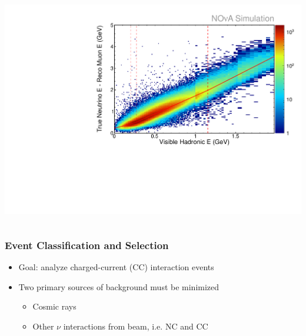 \documentclass[10pt,professionalfonts,xcolor=table]{beamer}
\begin{document}
\begin{frame}
\begin{columns}[c]
\includegraphics[height=\textwidth, angle=-90]{figures/plots/reco/numu_energy_had_fit.pdf}

\end{columns}


\end{frame}

\begin{frame}
\gap
\end{frame}



\begin{frame}
\frametitle{Event Classification and Selection}

\begin{itemize}
\item Goal: analyze \numu charged-current (CC) interaction events
\gap
\item Two primary sources of background must be minimized
  \begin{itemize}
  \item Cosmic rays
  \item Other $\nu$ interactions from beam, i.e. NC and \nue CC
  \end{itemize}
\end{itemize}
\end{frame}
\end{document}
